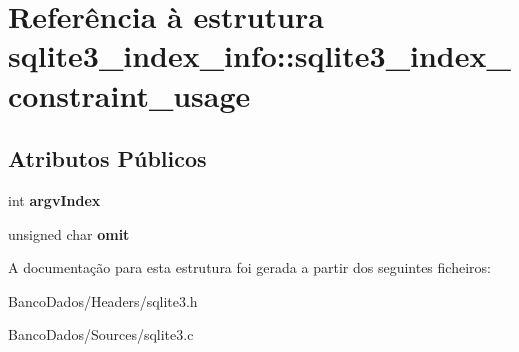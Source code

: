 \hypertarget{structsqlite3__index__info_1_1sqlite3__index__constraint__usage}{\section{Referência à estrutura sqlite3\-\_\-index\-\_\-info\-:\-:sqlite3\-\_\-index\-\_\-constraint\-\_\-usage}
\label{structsqlite3__index__info_1_1sqlite3__index__constraint__usage}
}
\subsection*{Atributos Públicos}
\begin{DoxyCompactItemize}
\item 
\hypertarget{structsqlite3__index__info_1_1sqlite3__index__constraint__usage_a2cbf680033c2937b3de226e091743a94}{int {\bfseries argv\-Index}}\label{structsqlite3__index__info_1_1sqlite3__index__constraint__usage_a2cbf680033c2937b3de226e091743a94}

\item 
\hypertarget{structsqlite3__index__info_1_1sqlite3__index__constraint__usage_ad07fa17d30e4fb3abe23ceaf84edf0ef}{unsigned char {\bfseries omit}}\label{structsqlite3__index__info_1_1sqlite3__index__constraint__usage_ad07fa17d30e4fb3abe23ceaf84edf0ef}

\end{DoxyCompactItemize}


A documentação para esta estrutura foi gerada a partir dos seguintes ficheiros\-:\begin{DoxyCompactItemize}
\item 
Banco\-Dados/\-Headers/sqlite3.\-h\item 
Banco\-Dados/\-Sources/sqlite3.\-c\end{DoxyCompactItemize}
